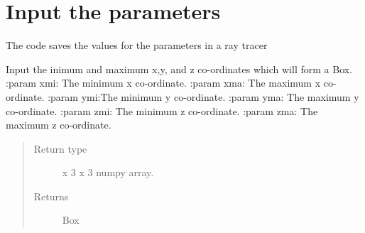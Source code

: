 \documentclass[letterpaper,10pt,english]{sphinxmanual}
\begin{document}
\chapter{Input the parameters}
\label{index:module-ParameterInput}\label{index:input-the-parameters}
The code saves the values for the parameters in a ray tracer

\begin{fulllineitems}
\label{index:ParameterInput.BoxBuild}
Input the inimum and maximum x,y, and z co-ordinates which will form a Box.
:param xmi: The minimum x co-ordinate.
:param xma: The maximum x co-ordinate.
:param ymi:The minimum y co-ordinate.
:param yma: The maximum y co-ordinate.
:param zmi: The minimum z co-ordinate.
:param zma: The maximum z co-ordinate.
\begin{quote}\begin{description}
\item[{Return type}]  x 3 x 3 numpy array.

\item[{Returns}] \leavevmode
Box

\end{description}\end{quote}

\end{fulllineitems}

\end{document}
